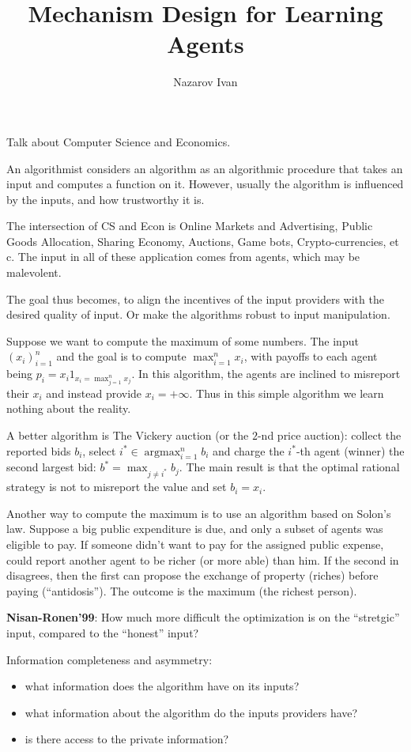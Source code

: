 \documentclass[a4paper]{article}
\title{Mechanism Design for Learning Agents}
\author{Nazarov Ivan}
\newcommand{\argmax}{\mathop{\text{argmax}}}
\begin{document}
Talk about Computer Science and Economics.

An algorithmist considers an algorithm as an algorithmic procedure that takes an
input and computes a function on it. However, usually the algorithm is influenced
by the inputs, and how trustworthy it is.

The intersection of CS and Econ is Online Markets and Advertising, Public Goods
Allocation, Sharing Economy, Auctions, Game bots, Crypto-currencies, et c.
The input in all of these application comes from agents, which may be malevolent.

The goal thus becomes, to align the incentives of the input providers with the desired
quality of input. Or make the algorithms robust to input manipulation.

Suppose we want to compute the maximum of some numbers.
The input $(x_i)_{i=1}^n$ and the goal is to compute $\max_{i=1}^n x_i$, with payoffs
to each agent being $p_i = x_i 1_{x_i = \max_{j=1}^n x_j}$. In this algorithm, the
agents are inclined to misreport their $x_i$ and instead provide $x_i=+\infty$. Thus
in this simple algorithm we learn nothing about the reality.

A better algorithm is The Vickery auction (or the $2$-nd price auction):
collect the reported bids $b_i$, select $i^* \in \argmax_{i=1}^n b_i$ and charge
the $i^*$-th agent (winner) the second largest bid: $b^* = \max_{j\neq i^*} b_j$.
The main result is that the optimal rational strategy is not to misreport the value
and set $b_i = x_i$.

Another way to compute the maximum is to use an algorithm based on Solon's law.
Suppose a big public expenditure is due, and only a subset of agents was eligible
to pay. If someone didn't want to pay for the assigned public expense, could report
another agent to be richer (or more able) than him. If the second in disagrees,
then the first can propose the exchange of property (riches) before paying (``antidosis'').
The outcome is the maximum (the richest person).

\textbf{Nisan-Ronen'99}: How much more difficult the optimization is on the ``stretgic''
input, compared to the ``honest'' input?

Information completeness and asymmetry:\begin{itemize}
	\item what information does the algorithm have on its inputs?
	\item what information about the algorithm do the inputs providers have?
	\item is there access to the private information?
\end{itemize}
\end{document}
